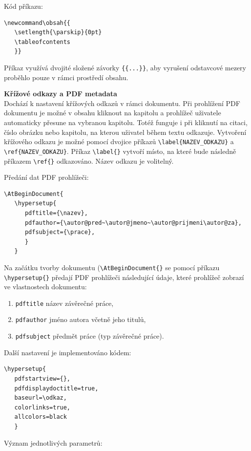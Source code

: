 \newpage
Kód příkazu:

\begin{verbatim}
\newcommand\obsah{{
   \setlength{\parskip}{0pt}    
   \tableofcontents
   }}
\end{verbatim}

Příkaz využívá dvojité složené závorky \verb|{{...}}|, aby vyrušení odstavcové mezery proběhlo pouze v rámci prostředí obsahu.

\vspace{8pt}
\textbf{Křížové odkazy a PDF metadata}\\
Dochází k nastavení křížových odkazů v rámci dokumentu. Při prohlížení PDF dokumentu je možné v obsahu kliknout na kapitolu a prohlížeč uživatele automaticky přesune na vybranou kapitolu. Totéž funguje i při kliknutí na citaci, číslo obrázku nebo kapitolu, na kterou uživatel během textu odkazuje. Vytvoření křížového odkazu je možné pomocí dvojice příkazů \verb|\label{NAZEV_ODKAZU}| a \verb|\ref{NAZEV_ODKAZU}|. Příkaz \verb|\label{}| vytvoří místo, na které bude následně příkazem \verb|\ref{}| odkazováno. Název odkazu je volitelný.

Předání dat PDF prohlížeči:

\begin{verbatim}
\AtBeginDocument{
   \hypersetup{
      pdftitle={\nazev},
      pdfauthor={\autor@pred~\autor@jmeno~\autor@prijmeni\autor@za},
      pdfsubject={\prace},
      }
   }
\end{verbatim}

Na začátku tvorby dokumentu (\verb|\AtBeginDocument{}| se pomocí příkazu \verb|\hypersetup{}| předají PDF prohlížeči následující údaje, které prohlížeč zobrazí ve vlastnostech dokumentu:

\begin{enumerate}
	\item \verb|pdftitle| název závěrečné práce,
	\item \verb|pdfauthor| jméno autora včetně jeho titulů,
	\item \verb|pdfsubject| předmět práce (typ závěrečné práce).
\end{enumerate}

Další nastavení je implementováno kódem:

\begin{verbatim}
\hypersetup{
   pdfstartview={},
   pdfdisplaydoctitle=true,
   baseurl=\odkaz,
   colorlinks=true,
   allcolors=black
   }
\end{verbatim}

Význam jednotlivých parametrů:

